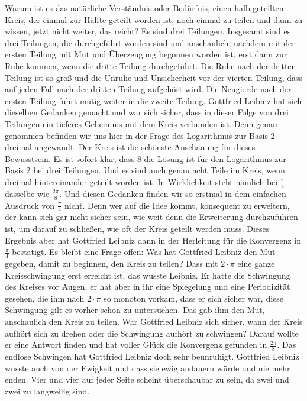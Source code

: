 \documentclass[a4paper,12pt,twoside]{report}
\theoremstyle{definition}
\begin{document}
Warum ist es das natürliche Verständnis oder Bedürfnis, einen halb geteilten Kreis, der einmal zur Hälfte geteilt worden ist, noch einmal zu teilen und dann zu wissen, jetzt nicht weiter, das reicht? Es sind drei Teilungen. Insgesamt sind es drei Teilungen, die durchgeführt worden sind und anschaulich, nachdem mit der ersten Teilung mit Mut und Überzeugung begonnen worden ist, erst dann zur Ruhe kommen, wenn die dritte Teilung durchgeführt. Die Ruhe nach der dritten Teilung ist so groß und die Unruhe und Unsicherheit vor der vierten Teilung, dass auf jeden Fall nach der dritten Teilung aufgehört wird. Die Neugierde nach der ersten Teilung führt mutig weiter in die zweite Teilung. Gottfried Leibniz hat sich dieselben Gedanken gemacht und war sich sicher, dass in dieser Folge von drei Teilungen ein tieferes Geheimnis mit dem Kreis verbunden ist. Denn genau genommen befinden wir uns hier in der Frage des Logarithmus zur Basis 2 dreimal angewandt. Der Kreis ist die schönste Anschauung für dieses Bewusstsein. Es ist sofort klar, dass 8 die Lösung ist für den Logarithmus zur Basis 2 bei drei Teilungen. Und es sind auch genau acht Teile im Kreis, wenn dreimal hintereinander geteilt worden ist. In Wirklichkeit steht nämlich bei $\frac{\pi}{4}$  dasselbe wie $\frac{2 \pi}{8}$. Und diesen Gedanken finden wir so erstmal in dem einfachen Ausdruck von $\frac{\pi}{4}$ nicht. Denn wer auf die Idee kommt, konsequent zu erweitern, der kann sich gar nicht sicher sein, wie weit denn die Erweiterung durchzuführen ist, um darauf zu schließen, wie oft der Kreis geteilt werden muss. Dieses Ergebnis aber hat Gottfried Leibniz dann in der Herleitung für die Konvergenz in $\frac{\pi}{4}$ bestätigt. Es bleibt eine Frage offen: Was hat Gottfried Leibniz den Mut gegeben, damit zu beginnen, den Kreis zu teilen? Dass mit $2 \cdot \pi$ eine ganze Kreisschwingung erst erreicht ist, das wusste Leibniz. Er hatte die Schwingung des Kreises vor Augen, er hat aber in ihr eine Spiegelung und eine Periodizität gesehen, die ihm nach $2 \cdot \pi$ so monoton vorkam, dass er sich sicher war, diese Schwingung gilt es vorher schon zu untersuchen. Das gab ihm den Mut, anschaulich den Kreis zu teilen. War Gottfried Leibniz sich sicher, wann der Kreis aufhört sich zu drehen oder die Schwingung aufhört zu schwingen? Darauf wollte er eine Antwort finden und hat voller Glück die Konvergenz gefunden in $\frac{2\pi}{8}$. Das endlose Schwingen hat Gottfried Leibniz doch sehr beunruhigt. Gottfried Leibniz wusste auch von der Ewigkeit und dass sie ewig andauern würde und nie mehr enden. Vier und vier auf jeder Seite scheint überschaubar zu sein, da zwei und zwei zu langweilig sind.
\end{document}
